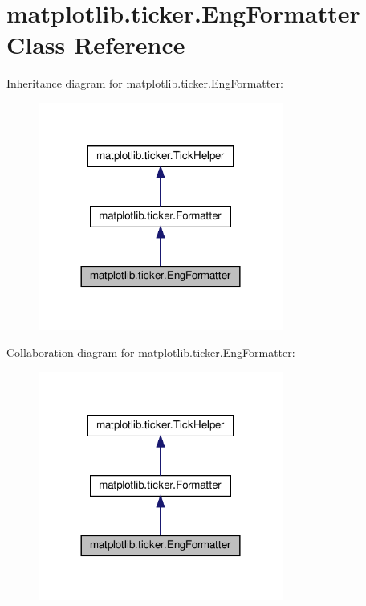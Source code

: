 \hypertarget{classmatplotlib_1_1ticker_1_1EngFormatter}{}\section{matplotlib.\+ticker.\+Eng\+Formatter Class Reference}
\label{classmatplotlib_1_1ticker_1_1EngFormatter}


Inheritance diagram for matplotlib.\+ticker.\+Eng\+Formatter\+:
\nopagebreak
\begin{figure}[H]
\begin{center}
\leavevmode
\includegraphics[width=228pt]{classmatplotlib_1_1ticker_1_1EngFormatter__inherit__graph}
\end{center}
\end{figure}


Collaboration diagram for matplotlib.\+ticker.\+Eng\+Formatter\+:
\nopagebreak
\begin{figure}[H]
\begin{center}
\leavevmode
\includegraphics[width=228pt]{classmatplotlib_1_1ticker_1_1EngFormatter__coll__graph}
\end{center}
\end{figure}
